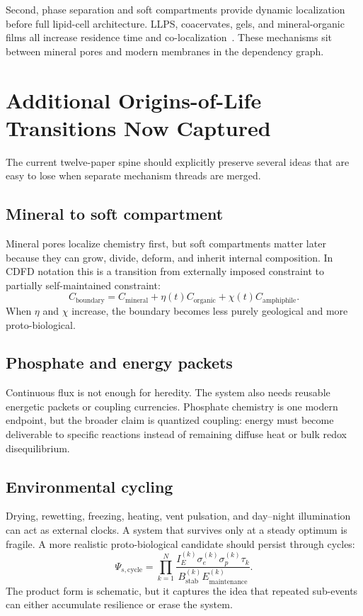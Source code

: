 \documentclass[11pt,a4paper]{article}
\begin{document}
Second, phase separation and soft compartments provide dynamic localization before full lipid-cell architecture. LLPS, coacervates, gels, and mineral-organic films all increase residence time and co-localization~\cite{Hanczyc2003,Szostak2010}. These mechanisms sit between mineral pores and modern membranes in the dependency graph.

\section{Additional Origins-of-Life Transitions Now Captured}
The current twelve-paper spine should explicitly preserve several ideas that are easy to lose when separate mechanism threads are merged.

\subsection{Mineral to soft compartment}
Mineral pores localize chemistry first, but soft compartments matter later because they can grow, divide, deform, and inherit internal composition. In CDFD notation this is a transition from externally imposed constraint to partially self-maintained constraint:
\begin{equation}
C_{\mathrm{boundary}}
=
C_{\mathrm{mineral}}
+\eta(t)C_{\mathrm{organic}}
+\chi(t)C_{\mathrm{amphiphile}}.
\end{equation}
When $\eta$ and $\chi$ increase, the boundary becomes less purely geological and more proto-biological.

\subsection{Phosphate and energy packets}
Continuous flux is not enough for heredity. The system also needs reusable energetic packets or coupling currencies. Phosphate chemistry is one modern endpoint, but the broader claim is quantized coupling: energy must become deliverable to specific reactions instead of remaining diffuse heat or bulk redox disequilibrium.

\subsection{Environmental cycling}
Drying, rewetting, freezing, heating, vent pulsation, and day--night illumination can act as external clocks. A system that survives only at a steady optimum is fragile. A more realistic proto-biological candidate should persist through cycles:
\begin{equation}
\Psi_{s,\mathrm{cycle}}
=
\prod_{k=1}^{N}
\frac{I_E^{(k)}\sigma_e^{(k)}\sigma_p^{(k)}\tau_k}
{B_{\mathrm{stab}}^{(k)}E_{\mathrm{maintenance}}^{(k)}}.
\end{equation}
The product form is schematic, but it captures the idea that repeated sub-events can either accumulate resilience or erase the system.
\end{document}
